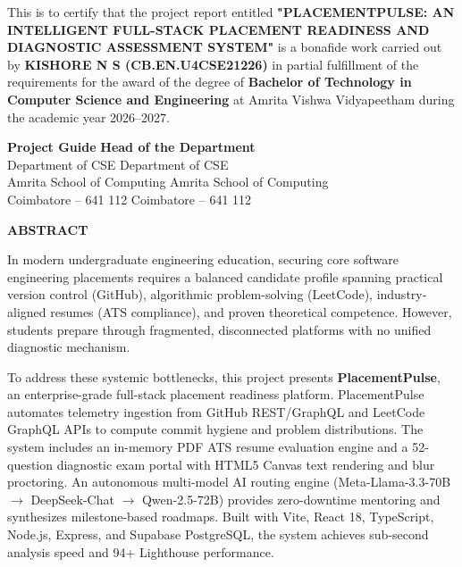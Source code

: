 \documentclass[12pt,a4paper]{report}
\begin{document}
\noindent This is to certify that the project report entitled \textbf{"PLACEMENTPULSE: AN INTELLIGENT FULL-STACK PLACEMENT READINESS AND DIAGNOSTIC ASSESSMENT SYSTEM"} is a bonafide work carried out by \textbf{KISHORE N S (CB.EN.U4CSE21226)} in partial fulfillment of the requirements for the award of the degree of \textbf{Bachelor of Technology in Computer Science and Engineering} at Amrita Vishwa Vidyapeetham during the academic year 2026--2027.

\vspace{2.5cm}

\noindent \textbf{Project Guide} \hfill \textbf{Head of the Department} \\
Department of CSE \hfill Department of CSE \\
Amrita School of Computing \hfill Amrita School of Computing \\
Coimbatore -- 641 112 \hfill Coimbatore -- 641 112

\newpage
{}
\setcounter{page}{3}
\begin{center}
    {\Large \textbf{ABSTRACT}}
\end{center}
\vspace{0.2cm}
In modern undergraduate engineering education, securing core software engineering placements requires a balanced candidate profile spanning practical version control (GitHub), algorithmic problem-solving (LeetCode), industry-aligned resumes (ATS compliance), and proven theoretical competence. However, students prepare through fragmented, disconnected platforms with no unified diagnostic mechanism. 

To address these systemic bottlenecks, this project presents \textbf{PlacementPulse}, an enterprise-grade full-stack placement readiness platform. PlacementPulse automates telemetry ingestion from GitHub REST/GraphQL and LeetCode GraphQL APIs to compute commit hygiene and problem distributions. The system includes an in-memory PDF ATS resume evaluation engine and a 52-question diagnostic exam portal with HTML5 Canvas text rendering and blur proctoring. An autonomous multi-model AI routing engine (Meta-Llama-3.3-70B $\rightarrow$ DeepSeek-Chat $\rightarrow$ Qwen-2.5-72B) provides zero-downtime mentoring and synthesizes milestone-based roadmaps. Built with Vite, React 18, TypeScript, Node.js, Express, and Supabase PostgreSQL, the system achieves sub-second analysis speed and 94+ Lighthouse performance.
\end{document}
